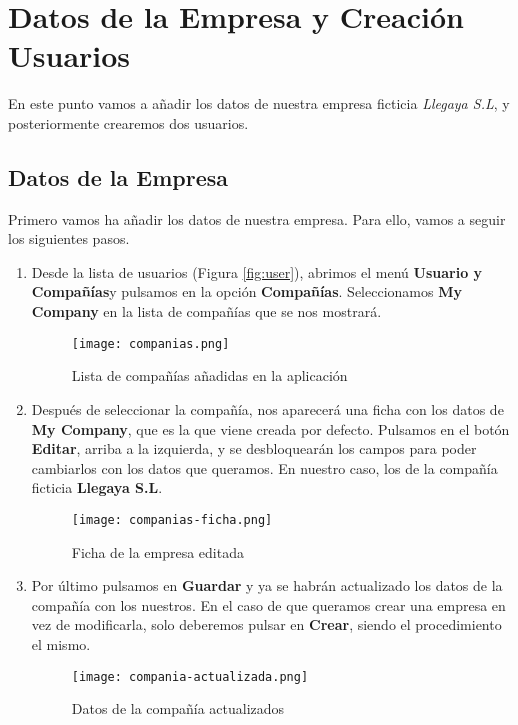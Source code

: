 \section{Datos de la Empresa y Creación Usuarios}

En este punto vamos a añadir los datos de nuestra empresa ficticia \textit{Llegaya S.L}, y posteriormente crearemos dos usuarios.

\subsection{Datos de la Empresa}
Primero vamos ha añadir los datos de nuestra empresa. Para ello, vamos a seguir los siguientes pasos.

\begin{enumerate}
    \item Desde la lista de usuarios (Figura \ref{fig:user}), abrimos el menú \textbf{Usuario y Compañías}y  pulsamos en la opción \textbf{Compañías}. Seleccionamos \textbf{My Company} en la lista de compañías que se nos mostrará.

    \begin{figure}[ht]
        \centering
        \texttt{[image: companias.png]}
        \caption{Lista de compañías añadidas en la aplicación}
    \end{figure}

    \vspace{5ex}

   \item Después de seleccionar la compañía, nos aparecerá una ficha con los datos de \textbf{My Company}, que es la que viene creada por defecto. Pulsamos en el botón \textbf{Editar}, arriba a la izquierda, y se desbloquearán los campos para poder cambiarlos con los datos que queramos. En nuestro caso, los de la compañía ficticia \textbf{Llegaya S.L}.

   \begin{figure}[ht]
       \centering
       \texttt{[image: companias-ficha.png]}
       \caption{Ficha de la empresa editada}
   \end{figure}

   \item Por último pulsamos en \textbf{Guardar} y ya se habrán actualizado los datos de la compañía con los nuestros. En el caso de que queramos crear una empresa en vez de modificarla, solo deberemos pulsar en \textbf{Crear}, siendo el procedimiento el mismo.

   \begin{figure}[ht]
       \centering
       \texttt{[image: compania-actualizada.png]}
       \caption{Datos de la compañía actualizados}
   \end{figure}
\end{enumerate}

